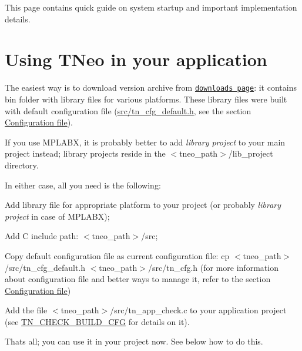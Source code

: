 This page contains quick guide on system startup and important implementation details.\hypertarget{quick_guide_usage_generic}{}\section{Using T\+Neo in your application}\label{quick_guide_usage_generic}
The easiest way is to download version archive from \href{https://bitbucket.org/dfrank/tneokernel/downloads}{\tt downloads page}\+: it contains {\ttfamily bin} folder with library files for various platforms. These library files were built with default configuration file ({\ttfamily \hyperlink{tn__cfg__default_8h}{src/tn\+\_\+cfg\+\_\+default.\+h}}, see the section \hyperlink{building_configuration_file}{Configuration file}).

If you use M\+P\+L\+A\+BX, it is probably better to add {\itshape library project} to your main project instead; library projects reside in the {\ttfamily $<$tneo\+\_\+path$>$/lib\+\_\+project} directory.

In either case, all you need is the following\+:


\begin{DoxyItemize}
\item Add library file for appropriate platform to your project (or probably {\itshape library project} in case of M\+P\+L\+A\+BX);
\item Add C include path\+: {\ttfamily $<$tneo\+\_\+path$>$/src};
\item Copy default configuration file as current configuration file\+: {\ttfamily cp $<$tneo\+\_\+path$>$/src/tn\+\_\+cfg\+\_\+default.h $<$tneo\+\_\+path$>$/src/tn\+\_\+cfg.h} (for more information about configuration file and better ways to manage it, refer to the section \hyperlink{building_configuration_file}{Configuration file})
\item Add the file {\ttfamily $<$tneo\+\_\+path$>$/src/tn\+\_\+app\+\_\+check.c} to your application project (see {\ttfamily \hyperlink{tn__cfg__default_8h_aacdc913eb66492cf69cf02a5de73578e}{T\+N\+\_\+\+C\+H\+E\+C\+K\+\_\+\+B\+U\+I\+L\+D\+\_\+\+C\+FG}} for details on it).
\end{DoxyItemize}

That\textquotesingle{}s all; you can use it in your project now. See below how to do this.

